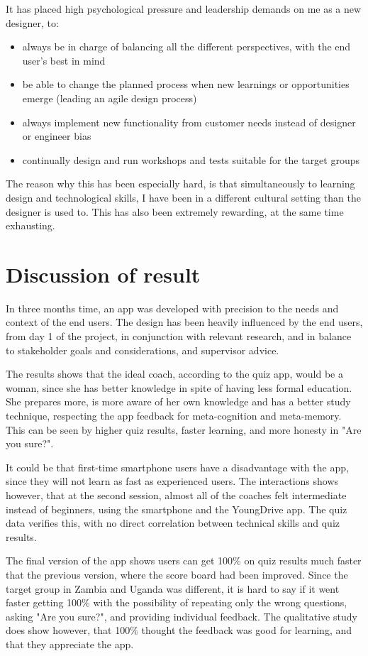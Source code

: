 It has placed high psychological pressure and leadership demands on me as a new designer, to:
\begin{itemize}
\item always be in charge of balancing all the different perspectives, with the end user's best in mind
\item be able to change the planned process when new learnings or opportunities emerge (leading an agile design process)
\item always implement new functionality from customer needs instead of designer or engineer bias
\item continually design and run workshops and tests suitable for the target groups
\end{itemize}

The reason why this has been especially hard, is that simultaneously to learning design and technological skills, I have been in a different cultural setting than the designer is used to. This has also been extremely rewarding, at the same time exhausting.

\section{Discussion of result}
In three months time, an app was developed with precision to the needs and context of the end users. The design has been heavily influenced by the end users, from day 1 of the project, in conjunction with relevant research, and in balance to stakeholder goals and considerations, and supervisor advice.

The results shows that the ideal coach, according to the quiz app, would be a woman, since she has better knowledge in spite of having less formal education. She prepares more, is more aware of her own knowledge and has a better study technique, respecting the app feedback for meta-cognition and meta-memory. This can be seen by higher quiz results, faster learning, and more honesty in "Are you sure?".

It could be that first-time smartphone users have a disadvantage with the app, since they will not learn as fast as experienced users. The interactions shows however, that at the second session, almost all of the coaches felt intermediate instead of beginners, using the smartphone and the YoungDrive app. The quiz data verifies this, with no direct correlation between technical skills and quiz results.

The final version of the app shows users can get 100\% on quiz results much faster that the previous version, where the score board had been improved. Since the target group in Zambia and Uganda was different, it is hard to say if it went faster getting 100\% with the possibility of repeating only the wrong questions, asking "Are you sure?", and providing individual feedback. The qualitative study does show however, that 100\% thought the feedback was good for learning, and that they appreciate the app.

